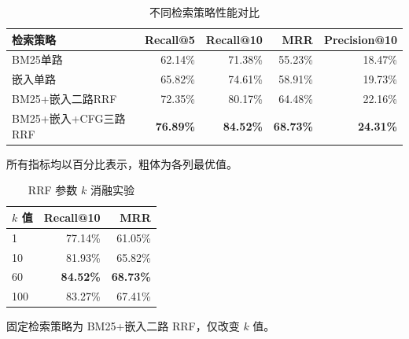 \usepackage{booktabs}


\begin{table}[htbp]
  \centering
  \caption{不同检索策略性能对比}
  \label{tab:retrieval-strategy}
  \begin{tabular}{lrrrr}
    \toprule
    \textbf{检索策略} & \textbf{Recall@5} & \textbf{Recall@10} & \textbf{MRR} & \textbf{Precision@10} \\
    \midrule
    BM25单路 & 62.14\% & 71.38\% & 55.23\% & 18.47\% \\
    嵌入单路 & 65.82\% & 74.61\% & 58.91\% & 19.73\% \\
    BM25+嵌入二路RRF & 72.35\% & 80.17\% & 64.48\% & 22.16\% \\
    BM25+嵌入+CFG三路RRF & \textbf{76.89\%} & \textbf{84.52\%} & \textbf{68.73\%} & \textbf{24.31\%} \\
    \bottomrule
  \end{tabular}
  \begin{tablenotes}\small\item 所有指标均以百分比表示，粗体为各列最优值。\end{tablenotes}
\end{table}

\begin{table}[htbp]
  \centering
  \caption{RRF 参数 $k$ 消融实验}
  \label{tab:rrf-ablation}
  \begin{tabular}{lrr}
    \toprule
    \textbf{$k$ 值} & \textbf{Recall@10} & \textbf{MRR} \\
    \midrule
    1 & 77.14\% & 61.05\% \\
    10 & 81.93\% & 65.82\% \\
    60 & \textbf{84.52\%} & \textbf{68.73\%} \\
    100 & 83.27\% & 67.41\% \\
    \bottomrule
  \end{tabular}
  \begin{tablenotes}\small\item 固定检索策略为 BM25+嵌入二路 RRF，仅改变 $k$ 值。\end{tablenotes}
\end{table}

